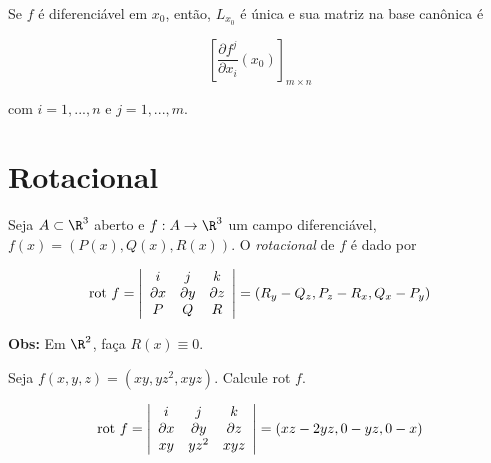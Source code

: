 \documentclass[11pt, oneside, a4paper]{gsm-l}
\begin{document}
\begin{teo}
Se $f$ é diferenciável em $x_0$, então, $L_{x_0}$ é \'unica e sua matriz na base can\^onica é

\[
\left[ {\frac{{\partial f^j }}
{{\partial x_i }}\left( {x_0 } \right)} \right]_{m \times n}
\]

com $i = 1,...,n$ e $j = 1,...,m$.
\end{teo}


\section{Rotacional} \label{sec25}

\begin{defi}
\begin{sloppypar}
Seja $A \subset \R^3$ aberto e $f:A \to \R^3$ um campo diferenciável, ${f\left( x \right) = \left( {P\left( x \right),Q\left( x \right),R\left( x \right)} \right)}$. O \textit{rotacional} de $f$ é dado por
\end{sloppypar}

\[
{\text{rot }}f = \left| {\begin{array}{*{20}c}
   i & j & k  \\
   {\partial x} & {\partial y} & {\partial z}  \\
   P & Q & R  \\

 \end{array} } \right| = \left( {R_y  - Q_z ,P_z  - R_x ,Q_x  - P_y } \right)
\]

\end{defi}

\textbf{Obs:} Em $\R^2$, faça $R\left( x \right) \equiv 0$.

\begin{exem}
Seja $f\left( {x,y,z} \right) = \left( {xy,yz^2 ,xyz} \right)$. Calcule rot $f$.
\end{exem}

\begin{sol}
\[
{\text{rot }}f = \left| {\begin{array}{*{20}c}
   i & j & k  \\
   {\partial x} & {\partial y} & {\partial z}  \\
   {xy} & {yz^2 } & {xyz}  \\

 \end{array} } \right| = \left( {xz - 2yz,0 - yz,0 - x} \right)
\]

\end{sol}
\end{document}
